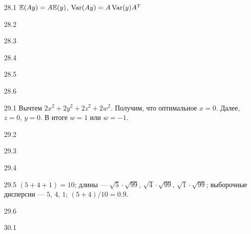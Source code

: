\protect \hypertarget {soln:28.1}{}
\begin{solution}{{28.1}}
$\mathbb{E}(Ay)=A\mathbb{E}(y)$, $\operatorname{Var}(Ay)=A\operatorname{Var}(y)A^T$
\end{solution}
\protect \hypertarget {soln:28.2}{}
\begin{solution}{{28.2}}

\end{solution}
\protect \hypertarget {soln:28.3}{}
\begin{solution}{{28.3}}

\end{solution}
\protect \hypertarget {soln:28.4}{}
\begin{solution}{{28.4}}

\end{solution}
\protect \hypertarget {soln:28.5}{}
\begin{solution}{{28.5}}

\end{solution}
\protect \hypertarget {soln:28.6}{}
\begin{solution}{{28.6}}

\end{solution}
\protect \hypertarget {soln:29.1}{}
\begin{solution}{{29.1}}
Вычтем $2x^2 + 2y^2 + 2z^2 + 2w^2$. Получим, что оптимальное $x=0$. Далее, $z=0$, $y=0$. В итоге $w=1$ или $w=-1$.
\end{solution}
\protect \hypertarget {soln:29.2}{}
\begin{solution}{{29.2}}
\end{solution}
\protect \hypertarget {soln:29.3}{}
\begin{solution}{{29.3}}
\end{solution}
\protect \hypertarget {soln:29.4}{}
\begin{solution}{{29.4}}
\end{solution}
\protect \hypertarget {soln:29.5}{}
\begin{solution}{{29.5}}
$(5+4+1)=10$; длины — $\sqrt{5}\cdot\sqrt{99}$, $\sqrt{4}\cdot\sqrt{99}$, $\sqrt{1}\cdot\sqrt{99}$; выборочные дисперсии — $5$, $4$, $1$; $(5+4)/10=0.9$.
\end{solution}
\protect \hypertarget {soln:29.6}{}
\begin{solution}{{29.6}}
\end{solution}
\protect \hypertarget {soln:30.1}{}
\begin{solution}{{30.1}}
  
\end{solution}
\protect \hypertarget {soln:30.2}{}
